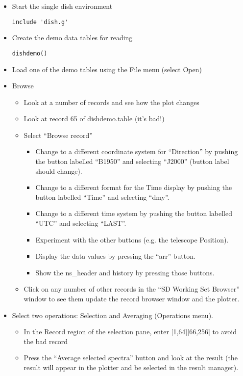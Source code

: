 \begin{itemize}
\item Start the single dish environment
\begin{verbatim}
include 'dish.g'
\end{verbatim}
\item Create the demo data tables for reading
\begin{verbatim}
dishdemo()
\end{verbatim}
\item Load one of the demo tables using the File menu (select Open)
\item Browse
\begin{itemize}
\item Look at a number of records and see how the plot changes
\item Look at record 65 of dishdemo.table (it's bad!)
\item Select ``Browse record''
\begin{itemize}
\item Change to a different coordinate system for ``Direction'' by pushing
the button labelled ``B1950'' and selecting ``J2000'' (button label should
change).
\item Change to a different format for the Time display by pushing the
button labelled ``Time'' and selecting ``dmy''.
\item Change to a different time system by pushing the button labelled
``UTC'' and selecting ``LAST''.
\item Experiment with the other buttons (e.g. the telescope Position).
\item Display the data values by pressing the ``arr'' button.
\item Show the ns\_header and history by pressing those buttons.
\end{itemize}
\item Click on any number of other records in the ``SD Working Set Browser''
window to see them update the record browser window and the plotter.
\end{itemize}
\item Select two operations: Selection and Averaging (Operations menu).
\begin{itemize}
\item In the Record region of the selection pane, enter [1,64][66,256]
to avoid the bad record
\item Press the ``Average selected spectra'' button and look at the result
(the result will appear in the plotter and be selected in the result manager).

\end{itemize}
\end{itemize}
